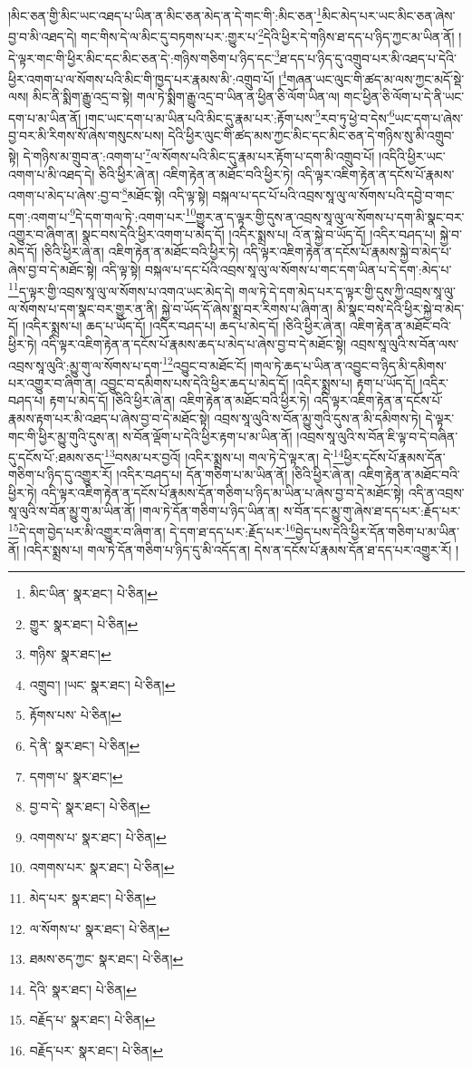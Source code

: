 །མིང་ཅན་གྱི་མིང་ཡང་འཐད་པ་ཡིན་ན་མིང་ཅན་མེད་ན་དེ་གང་གི་:མིང་ཅན་\footnote{མིང་ཡིན་  སྣར་ཐང་།  པེ་ཅིན། }མིང་མེད་པར་ཡང་མིང་ཅན་ཞེས་བྱ་བ་མི་འཐད་དེ། གང་གིས་དེ་ལ་མིང་དུ་བཏགས་པར་:གྱུར་པ་\footnote{གྱུར་  སྣར་ཐང་།  པེ་ཅིན། }དེའི་ཕྱིར་དེ་གཉིས་ཐ་དད་པ་ཉིད་ཀྱང་མ་ཡིན་ནོ། །དེ་ལྟར་གང་གི་ཕྱིར་མིང་དང་མིང་ཅན་དེ་:གཉིས་གཅིག་པ་ཉིད་དང་\footnote{གཉིས་  སྣར་ཐང་། }ཐ་དད་པ་ཉིད་དུ་འགྲུབ་པར་མི་འཐད་པ་དེའི་ཕྱིར་འགག་པ་ལ་སོགས་པའི་མིང་གི་ཁྱད་པར་རྣམས་མི་:འགྲུབ་པོ། །\footnote{འགྲུབ་། །ཡང་  སྣར་ཐང་།  པེ་ཅིན། }གཞན་ཡང་ལུང་གི་ཚད་མ་ལས་ཀྱང་མདོ་སྡེ་ལས། མིང་ནི་སྨིག་རྒྱུ་འདྲ་བ་སྟེ། གལ་ཏེ་སྨིག་རྒྱུ་འདྲ་བ་ཡིན་ན་ཕྱིན་ཅི་ལོག་ཡིན་ལ། གང་ཕྱིན་ཅི་ལོག་པ་དེ་ནི་ཡང་དག་པ་མ་ཡིན་ནོ། །གང་ཡང་དག་པ་མ་ཡིན་པའི་མིང་དུ་རྣམ་པར་:རྟོག་པས་\footnote{རྟོགས་པས་  པེ་ཅིན། }རབ་ཏུ་ཕྱེ་བ་དེས་\footnote{དེ་ནི་  སྣར་ཐང་།  པེ་ཅིན། }ཡང་དག་པ་ཞེས་བྱ་བར་མི་རིགས་སོ་ཞེས་གསུངས་པས། དེའི་ཕྱིར་ལུང་གི་ཚད་མས་ཀྱང་མིང་དང་མིང་ཅན་དེ་གཉིས་སུ་མི་འགྲུབ་སྟེ། དེ་གཉིས་མ་གྲུབ་ན་:འགག་པ་\footnote{དགག་པ་  སྣར་ཐང་། }ལ་སོགས་པའི་མིང་དུ་རྣམ་པར་རྟོག་པ་དག་མི་འགྲུབ་པོ། །འདིའི་ཕྱིར་ཡང་འགག་པ་མི་འཐད་དེ། ཅིའི་ཕྱིར་ཞེ་ན། འཇིག་རྟེན་ན་མཐོང་བའི་ཕྱིར་ཏེ། འདི་ལྟར་འཇིག་རྟེན་ན་དངོས་པོ་རྣམས་འགག་པ་མེད་པ་ཞེས་:བྱ་བ་\footnote{བྱ་བ་དེ་  སྣར་ཐང་།  པེ་ཅིན། }མཐོང་སྟེ། འདི་ལྟ་སྟེ། བསྐལ་པ་དང་པོ་པའི་འབྲས་སཱ་ལུ་ལ་སོགས་པའི་དབྱེ་བ་གང་དག་:འགག་པ་\footnote{འགགས་པ་  སྣར་ཐང་།  པེ་ཅིན། }དེ་དག་གལ་ཏེ་:འགག་པར་\footnote{འགགས་པར་  སྣར་ཐང་།  པེ་ཅིན། }གྱུར་ན་ད་ལྟར་གྱི་དུས་ན་འབྲས་སཱ་ལུ་ལ་སོགས་པ་དག་མི་སྣང་བར་འགྱུར་བ་ཞིག་ན། སྣང་བས་དེའི་ཕྱིར་འགག་པ་མེད་དོ། །འདིར་སྨྲས་པ། འོ་ན་སྐྱེ་བ་ཡོད་དོ། །འདིར་བཤད་པ། སྐྱེ་བ་མེད་དོ། །ཅིའི་ཕྱིར་ཞེ་ན། འཇིག་རྟེན་ན་མཐོང་བའི་ཕྱིར་ཏེ། འདི་ལྟར་འཇིག་རྟེན་ན་དངོས་པོ་རྣམས་སྐྱེ་བ་མེད་པ་ཞེས་བྱ་བ་དེ་མཐོང་སྟེ། འདི་ལྟ་སྟེ། བསྐལ་པ་དང་པོའི་འབྲས་སཱ་ལུ་ལ་སོགས་པ་གང་དག་ཡིན་པ་དེ་དག་:མེད་པ་\footnote{མེད་པར་  སྣར་ཐང་།  པེ་ཅིན། }ད་ལྟར་གྱི་འབྲས་སཱ་ལུ་ལ་སོགས་པ་འགའ་ཡང་མེད་དེ། གལ་ཏེ་དེ་དག་མེད་པར་ད་ལྟར་གྱི་དུས་ཀྱི་འབྲས་སཱ་ལུ་ལ་སོགས་པ་དག་སྣང་བར་གྱུར་ན་ནི། སྐྱེ་བ་ཡོད་དོ་ཞེས་སྨྲ་བར་རིགས་པ་ཞིག་ན། མི་སྣང་བས་དེའི་ཕྱིར་སྐྱེ་བ་མེད་དོ། །འདིར་སྨྲས་པ། ཆད་པ་ཡོད་དོ། །འདིར་བཤད་པ། ཆད་པ་མེད་དོ། །ཅིའི་ཕྱིར་ཞེ་ན། འཇིག་རྟེན་ན་མཐོང་བའི་ཕྱིར་ཏེ། འདི་ལྟར་འཇིག་རྟེན་ན་དངོས་པོ་རྣམས་ཆད་པ་མེད་པ་ཞེས་བྱ་བ་དེ་མཐོང་སྟེ། འབྲས་སཱ་ལུའི་ས་བོན་ལས་འབྲས་སཱ་ལུའི་:མྱུ་གུ་ལ་སོགས་པ་དག་\footnote{ལ་སོགས་པ་  སྣར་ཐང་།  པེ་ཅིན། }འབྱུང་བ་མཐོང་ངོ། །གལ་ཏེ་ཆད་པ་ཡིན་ན་འབྱུང་བ་ཉིད་མི་དམིགས་པར་འགྱུར་བ་ཞིག་ན། འབྱུང་བ་དམིགས་པས་དེའི་ཕྱིར་ཆད་པ་མེད་དོ། །འདིར་སྨྲས་པ། རྟག་པ་ཡོད་དོ། །འདིར་བཤད་པ། རྟག་པ་མེད་དོ། །ཅིའི་ཕྱིར་ཞེ་ན། འཇིག་རྟེན་ན་མཐོང་བའི་ཕྱིར་ཏེ། འདི་ལྟར་འཇིག་རྟེན་ན་དངོས་པོ་རྣམས་རྟག་པར་མི་འཐད་པ་ཞེས་བྱ་བ་དེ་མཐོང་སྟེ། འབྲས་སཱ་ལུའི་ས་བོན་མྱུ་གུའི་དུས་ན་མི་དམིགས་ཏེ། དེ་ལྟར་གང་གི་ཕྱིར་མྱུ་གུའི་དུས་ན། ས་བོན་ལྡོག་པ་དེའི་ཕྱིར་རྟག་པ་མ་ཡིན་ནོ། །འབྲས་སཱ་ལུའི་ས་བོན་ཇི་ལྟ་བ་དེ་བཞིན་དུ་དངོས་པོ་:ཐམས་ཅད་\footnote{ཐམས་ཅད་ཀྱང་  སྣར་ཐང་།  པེ་ཅིན། }བསམ་པར་བྱའོ། །འདིར་སྨྲས་པ། གལ་ཏེ་དེ་ལྟར་ན། དེ་\footnote{དེའི་  སྣར་ཐང་།  པེ་ཅིན། }ཕྱིར་དངོས་པོ་རྣམས་དོན་གཅིག་པ་ཉིད་དུ་འགྱུར་རོ། །འདིར་བཤད་པ། དོན་གཅིག་པ་མ་ཡིན་ནོ། །ཅིའི་ཕྱིར་ཞེ་ན། འཇིག་རྟེན་ན་མཐོང་བའི་ཕྱིར་ཏེ། འདི་ལྟར་འཇིག་རྟེན་ན་དངོས་པོ་རྣམས་དོན་གཅིག་པ་ཉིད་མ་ཡིན་པ་ཞེས་བྱ་བ་དེ་མཐོང་སྟེ། འདི་ན་འབྲས་སཱ་ལུའི་ས་བོན་མྱུ་གུ་མ་ཡིན་ནོ། །གལ་ཏེ་དོན་གཅིག་པ་ཉིད་ཡིན་ན། ས་བོན་དང་མྱུ་གུ་ཞེས་ཐ་དད་པར་:རྗོད་པར་\footnote{བརྗོད་པ་  སྣར་ཐང་།  པེ་ཅིན། }དེ་དག་བྱེད་པར་མི་འགྱུར་བ་ཞིག་ན། དེ་དག་ཐ་དད་པར་:རྗོད་པར་\footnote{བརྗོད་པར་  སྣར་ཐང་།  པེ་ཅིན། }བྱེད་པས་དེའི་ཕྱིར་དོན་གཅིག་པ་མ་ཡིན་ནོ། །འདིར་སྨྲས་པ། གལ་ཏེ་དོན་གཅིག་པ་ཉིད་དུ་མི་འདོད་ན། དེས་ན་དངོས་པོ་རྣམས་དོན་ཐ་དད་པར་འགྱུར་རོ། །
